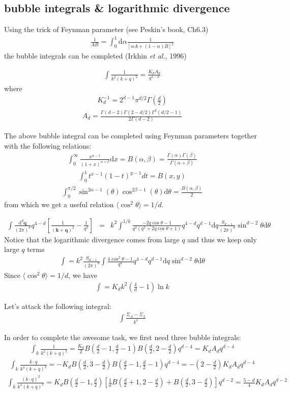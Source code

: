 \documentclass[aps,notitlepage]{revtex4-1}
\newcommand{\bea}{\begin{eqnarray}}
\newcommand{\eea}{\end{eqnarray}}
\newcommand{\bq}{\mathbf{q}}
\newcommand{\bk}{\mathbf{k}}
\newcommand{\md}{\mathrm{d}}
\begin{document}
\begin{appendix}
\section{bubble integrals \& logarithmic divergence}
Using the trick of Feynman parameter (see Peskin's book, Ch6.3)
\bea \frac{1}{AB}=\int_0^1 \md \alpha \frac{1}{[\alpha A+(1-\alpha)B]^2} \eea
the bubble integrals can be completed (Irkhin {\it et al.}, 1996)

\bea \int \frac{1}{k^2(k+q)^2} = \frac{K_d A_d}{q^{4-d}} \eea
where 
\bea K_d^{-1}=2^{d-1}\pi^{d/2}\Gamma\left(\frac{d}{2}\right) \eea
\bea A_d=\frac{\Gamma(d-2)\Gamma(2-d/2)\Gamma^2(d/2-1)}{2\Gamma(d-2)} \eea



The above bubble integral can be completed using Feynman parameters together with the following relations:
\bea \int_0^\infty \frac{x^{\alpha-1}}{(1+x)^{\alpha+\beta}}\md x=B(\alpha,\beta)=\frac{\Gamma(\alpha)\Gamma(\beta)}{\Gamma(\alpha+\beta)} \eea 
\bea \int_0^1 t^{x-1}(1-t)^{y-1}dt = B(x,y) \eea 
\bea \int_0^{\pi/2} \sin^{2\alpha-1}(\theta)\cos^{2\beta-1}(\theta)\md \theta=\frac{B(\alpha,\beta)}{2} \eea
from which we get a useful relation $\langle \cos^2\theta \rangle=1/d$. 


\bea \int \frac{\md^d\bq}{(2\pi)^d} q^{4-d}\left[ \frac{1}{(\bk+\bq)^2}-\frac{1}{q^2} \right]
&=& k^2\int^{1/k}\frac{-2q\cos\theta-1}{q^2(q^2+2q\cos\theta+1)}q^{4-d} q^{d-1}\md q \frac{S_{d-1}}{(2\pi)^d} \sin^{d-2}\theta \md\theta \eea
Notice that the logarithmic divergence comes from large $q$ and thus we keep only large $q$ terms
\bea \int = k^2\frac{S_{d-1}}{(2\pi)^d} \int \frac{4\cos^2\theta-1}{q^4}q^{4-d}q^{d-1}\md q \sin^{d-2}\theta \md \theta \eea
Since $\langle \cos^2\theta\rangle=1/d$, we have
\bea \int = K_d k^2\left(\frac{4}{d}-1\right)\ln k \eea 


Let's attack the following integral:
\bea \int \frac{\Sigma_A-\Sigma_\lambda}{k^4} \eea 

In order to complete the awesome task, we first need three bubble integrals:
\bea \int_k \frac{1}{k^2(k+q)^2} = \frac{K_d}{2} B\left( \frac{d}{2}-1,\frac{d}{2}-1 \right) B\left( \frac{d}{2},2-\frac{d}{2} \right) q^{d-4} = K_d A_d q^{d-4}\eea
\bea \int_k \frac{k\cdot q}{k^4(k+q)^2}=-K_d B\left(\frac{d}{2},3-\frac{d}{2}\right)B\left(\frac{d}{2}-1,\frac{d}{2}-1\right) q^{d-4} = -\left(2-\frac{d}{2}\right) K_d A_d q^{d-4} \eea
\bea \int_k \frac{(k\cdot q)^2}{k^4(k+q)^2} = K_d B\left(\frac{d}{2}-1,\frac{d}{2}\right)\left[\frac{1}{d}B\left(\frac{d}{2}+1,2-\frac{d}{2}\right)+B\left(\frac{d}{2},3-\frac{d}{2}\right)\right] q^{d-2} = \frac{5-d}{4} K_dA_d q^{d-2}\eea 


\end{appendix}
\end{document}
